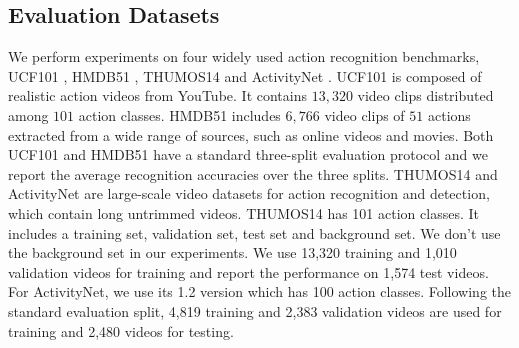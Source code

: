 \documentclass[runningheads]{llncs}
\begin{document}
		\subsection{Evaluation Datasets}
		\label{sec:dataset}
		We perform experiments on {\color{black} four} widely used action recognition benchmarks, UCF101 \cite{ucf101}, HMDB51 \cite{hmdb51}, {\color{black} THUMOS14 \cite{THUMOS15} and ActivityNet \cite{activityNet}}.
		UCF101 is composed of realistic action videos from YouTube. It contains $13,320$ video clips distributed among $101$ action classes. HMDB51 includes $6,766$ video clips of $51$ actions extracted from a wide range of sources, such as online videos and movies.
		Both UCF101 and HMDB51 have a standard three-split evaluation protocol and we report the average recognition accuracies over the three splits. {\color{black} THUMOS14 and ActivityNet are large-scale video datasets for action recognition and detection, which contain long untrimmed videos. THUMOS14 has 101 action classes. It includes a training set, validation set, test set and background set. We don't use the background set in our experiments. We use 13,320 training and 1,010 validation videos for training and report the performance on 1,574 test videos. For ActivityNet, we use its 1.2 version which has 100 action classes. Following the standard evaluation split, 4,819 training and 2,383 validation videos are used for training and 2,480 videos for testing. }
		
\end{document}
